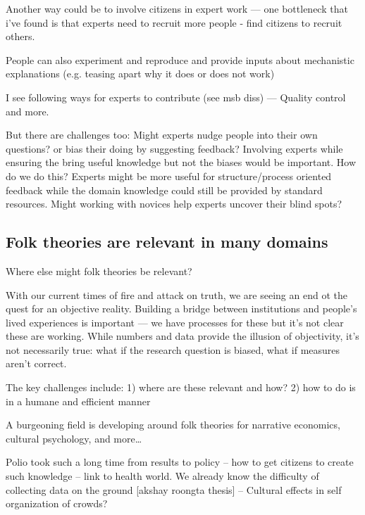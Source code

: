 Another way could be to involve citizens in expert work — one bottleneck that i’ve found is that experts need to recruit more people - find citizens to recruit others. 

People can also experiment and reproduce and provide inputs about mechanistic explanations (e.g. teasing apart why it does or does not work)

I see following ways for experts to contribute (see msb diss) — Quality control  and more.

But there are challenges too: Might experts nudge people into their own questions? or bias their doing by suggesting feedback?
    Involving experts while ensuring the bring useful knowledge but not the biases would be important. How do we do this? Experts might be more useful for structure/process oriented feedback while the domain knowledge could still be provided by standard resources. Might working with novices help experts uncover their blind spots?

\subsection{Folk theories are relevant in many domains}
Where else might folk theories be relevant?

With our current times of fire and attack on truth, we are seeing an end ot the quest for an objective reality. Building a bridge between institutions and people’s lived experiences is important — we have processes for these but it’s not clear these are working. While numbers and data provide the illusion of objectivity, it’s not necessarily true: what if the research question is biased, what if measures aren’t correct. 

The key challenges include: 1) where are these relevant and how? 2) how to do is in a humane and efficient manner

A burgeoning field is developing around folk theories for narrative economics, cultural psychology, and more… 

Polio took such a long time from results to policy --  how to get citizens to create such knowledge -- link to health world. We already know the difficulty of collecting data on the ground [akshay roongta thesis] -- Cultural effects in self organization of crowds?

